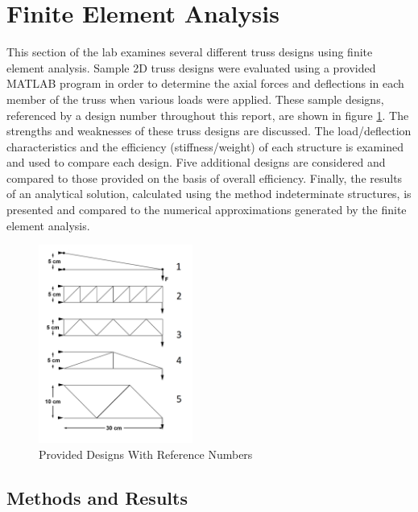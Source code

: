 \section{Finite Element Analysis}

This section of the lab examines several different truss designs using finite element analysis.
Sample 2D truss designs were evaluated using a provided MATLAB program in order to determine the axial forces and deflections in each member of the truss when various loads were applied. 
These sample designs, referenced by a design number throughout this report, are shown in figure \ref{fig:designs_given}.
The strengths and weaknesses of these truss designs are discussed. 
The load/deflection characteristics and the efficiency (stiffness/weight) of each structure is examined and used to compare each design.
Five additional designs are considered and compared to those provided on the basis of overall efficiency.
Finally, the results of an analytical solution, calculated using the method indeterminate structures, is presented and compared to the numerical approximations generated by the finite element analysis.

 \begin{figure}[p]
    \centering
    \includegraphics[width=0.45\textwidth]{images/designs_given}
    \caption{Provided Designs With Reference Numbers}
    \label{fig:designs_given}
\end{figure}

\subsection{Methods and Results}

	

	

